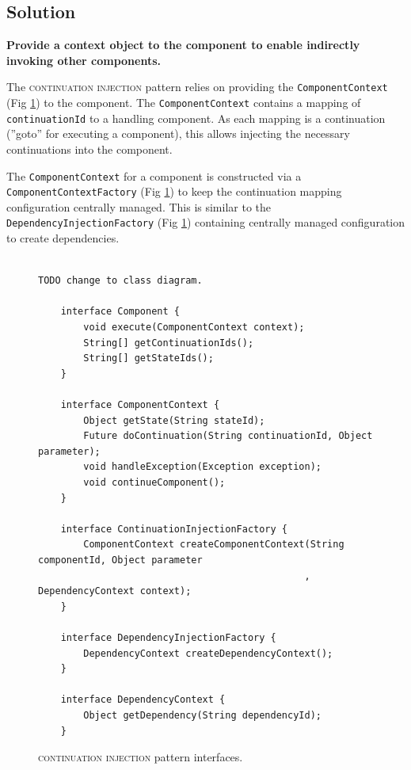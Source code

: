 \documentclass[prodmode]{style/acmlarge}
\begin{document}
\subsection{Solution}

\textbf{Provide a context object to the component to enable indirectly invoking other components.}

The \textsc{continuation injection} pattern relies on providing the
\texttt{ComponentContext} (Fig \ref{fig:ContinuationInjectionInterfaces}) to the
component.  The \texttt{ComponentContext} contains a mapping of
\texttt{continuationId} to a handling component.  As each mapping is a
continuation (''goto'' for executing a component), this allows injecting the
necessary continuations into the component.

The \texttt{ComponentContext} for a component is constructed via a
\texttt{ComponentContextFactory} (Fig \ref{fig:ContinuationInjectionInterfaces})
to keep the continuation mapping configuration centrally managed.  This is
similar to the \texttt{DependencyInjectionFactory} (Fig
\ref{fig:ContinuationInjectionInterfaces}) containing centrally managed
configuration to create dependencies.

\begin{figure}[tp]
\centering
\begin{verbatim}

TODO change to class diagram.

    interface Component {
        void execute(ComponentContext context);
        String[] getContinuationIds();
        String[] getStateIds();
    }

    interface ComponentContext {
        Object getState(String stateId);
        Future doContinuation(String continuationId, Object parameter);
        void handleException(Exception exception);
        void continueComponent();
    }
    
    interface ContinuationInjectionFactory {
        ComponentContext createComponentContext(String componentId, Object parameter
                                               , DependencyContext context);
    }
    
    interface DependencyInjectionFactory {
        DependencyContext createDependencyContext();
    }
    
    interface DependencyContext {
        Object getDependency(String dependencyId);
    }
\end{verbatim}
\caption{\textsc{continuation injection} pattern interfaces\footnotemark.}
\label{fig:ContinuationInjectionInterfaces}
\end{figure}
\end{document}
